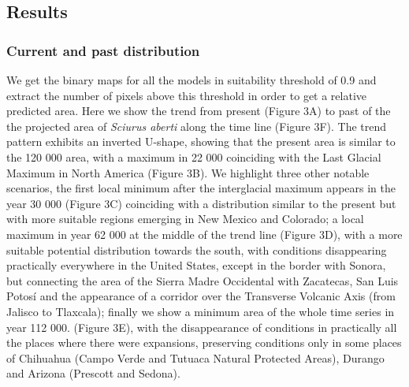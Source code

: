 \documentclass[
]{article}
\begin{document}
\hypertarget{results}{%
\subsection{Results}\label{results}}

\hypertarget{current-and-past-distribution}{%
\subsubsection{Current and past
distribution}\label{current-and-past-distribution}}

We get the binary maps for all the models in suitability threshold of
0.9 and extract the number of pixels above this threshold in order to
get a relative predicted area. Here we show the trend from present
(Figure 3A) to past of the the projected area of \emph{Sciurus aberti}
along the time line (Figure 3F). The trend pattern exhibits an inverted
U-shape, showing that the present area is similar to the 120 000 area,
with a maximum in 22 000 coinciding with the Last Glacial Maximum in
North America (Figure 3B). We highlight three other notable scenarios,
the first local minimum after the interglacial maximum appears in the
year 30 000 (Figure 3C) coinciding with a distribution similar to the
present but with more suitable regions emerging in New Mexico and
Colorado; a local maximum in year 62 000 at the middle of the trend line
(Figure 3D), with a more suitable potential distribution towards the
south, with conditions disappearing practically everywhere in the United
States, except in the border with Sonora, but connecting the area of the
Sierra Madre Occidental with Zacatecas, San Luis Potosí and the
appearance of a corridor over the Transverse Volcanic Axis (from Jalisco
to Tlaxcala); finally we show a minimum area of the whole time series in
year 112 000. (Figure 3E), with the disappearance of conditions in
practically all the places where there were expansions, preserving
conditions only in some places of Chihuahua (Campo Verde and Tutuaca
Natural Protected Areas), Durango and Arizona (Prescott and Sedona).
\end{document}
